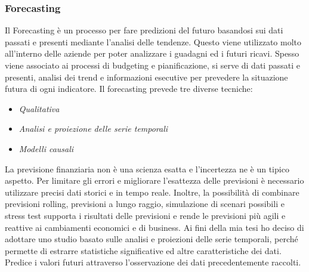 \subsubsection{Forecasting}
Il Forecasting è un processo per fare predizioni del futuro basandosi sui dati passati e presenti mediante l'analisi delle tendenze. Questo viene utilizzato molto all'interno delle aziende per poter analizzare i guadagni ed i futuri ricavi.
Spesso viene associato ai processi di budgeting e pianificazione, si serve di dati passati e presenti, analisi dei trend e informazioni esecutive per prevedere la situazione futura di ogni  indicatore.
Il forecasting prevede tre diverse tecniche:
\begin{itemize}
\item \textit{Qualitativa}
\item \textit{Analisi e proiezione delle serie temporali}
\item \textit{Modelli causali}
\end{itemize}
La previsione finanziaria non è una scienza esatta e l'incertezza ne è un tipico aspetto. Per limitare gli errori e migliorare l'esattezza delle previsioni è necessario utilizzare precisi dati storici e in tempo reale. Inoltre, la possibilità di combinare previsioni rolling, previsioni a lungo raggio, simulazione di scenari possibili e stress test supporta i risultati delle previsioni e rende le previsioni più agili e reattive ai cambiamenti economici e di business.
Ai fini della mia tesi ho deciso di adottare uno studio basato sulle analisi e proiezioni delle serie temporali, perché permette di estrarre statistiche significative ed altre caratteristiche dei dati. Predice i valori futuri attraverso l'osservazione dei dati precedentemente raccolti.




